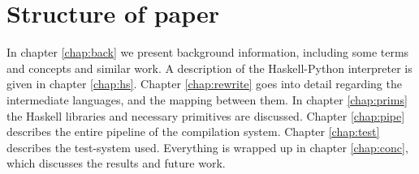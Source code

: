 

\section{Structure of paper}
In chapter \ref{chap:back} we present background information, including 
some terms and concepts and similar work. 
%
A description of the 
Haskell-Python interpreter is given in chapter \ref{chap:hs}.
%
Chapter \ref{chap:rewrite} goes into detail regarding the intermediate 
languages, and the mapping between them.
%
In chapter \ref{chap:prims} the Haskell libraries and necessary primitives
are discussed.
%
Chapter \ref{chap:pipe} describes the entire pipeline of the compilation system.
%
Chapter \ref{chap:test} describes the test-system used.
%
Everything is wrapped up in chapter \ref{chap:conc}, which discusses the 
results and future work.
